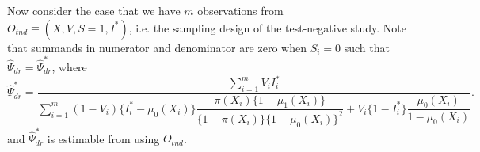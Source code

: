 \begin{appendix}
Now consider the case that we have $m$ observations from $O_{tnd} \equiv (X, V, S=1, I^*)$, i.e. the sampling design of the test-negative study. Note that summands in numerator and denominator are zero when $S_i=0$ such that $\widehat{\Psi}_{dr} = \widehat{\Psi}^*_{dr}$, where
\begin{equation*}
    \widehat{\Psi}^*_{dr} = \dfrac{\sum_{i=1}^{m}  V_i I_i^*}{\sum_{i=1}^m(1 - V_i)\{I_i^* - \mu_0(X_i)\}\dfrac{\pi(X_i)\{1 - \mu_1(X_i)\}}{\{1 - \pi(X_i)\}\{1 - \mu_0(X_i)\}^2} + V_i\{1-I_i^*\}\dfrac{\mu_0(X_i)}{1 - \mu_0(X_i)}}.
\end{equation*}
and $\widehat{\Psi}^*_{dr}$ is estimable from using $O_{tnd}$.


\end{appendix}
